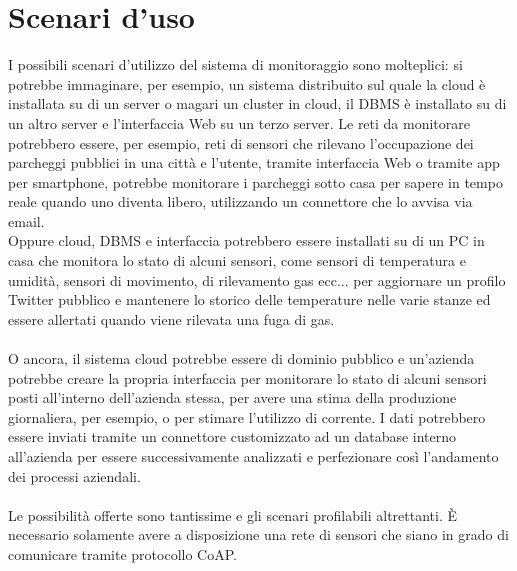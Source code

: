 \section{Scenari d'uso}
I possibili scenari d'utilizzo del sistema di monitoraggio sono molteplici: si potrebbe immaginare, per esempio, un sistema distribuito sul quale la cloud è installata su di un server o magari un cluster in cloud, il DBMS è installato su di un altro server e l'interfaccia Web su un terzo server. Le reti da monitorare potrebbero essere, per esempio, reti di sensori che rilevano l'occupazione dei parcheggi pubblici in una città e l'utente, tramite interfaccia Web o tramite app per smartphone, potrebbe monitorare i parcheggi sotto casa per sapere in tempo reale quando uno diventa libero, utilizzando un connettore che lo avvisa via email.
\\Oppure cloud, DBMS e interfaccia potrebbero essere installati su di un PC in casa che monitora lo stato di alcuni sensori, come sensori di temperatura e umidità, sensori di movimento, di rilevamento gas ecc... per aggiornare un profilo Twitter pubblico e mantenere lo storico delle temperature nelle varie stanze ed essere allertati quando viene rilevata una fuga di gas.
\\\\O ancora, il sistema cloud potrebbe essere di dominio pubblico e un'azienda potrebbe creare la propria interfaccia per monitorare lo stato di alcuni sensori posti all'interno dell'azienda stessa, per avere una stima della produzione giornaliera, per esempio, o per stimare l'utilizzo di corrente. I dati potrebbero essere inviati tramite un connettore customizzato ad un database interno all'azienda per essere successivamente analizzati e perfezionare così l'andamento dei processi aziendali.
\\\\Le possibilità offerte sono tantissime e gli scenari profilabili altrettanti. È necessario solamente avere a disposizione una rete di sensori che siano in grado di comunicare tramite protocollo CoAP.

